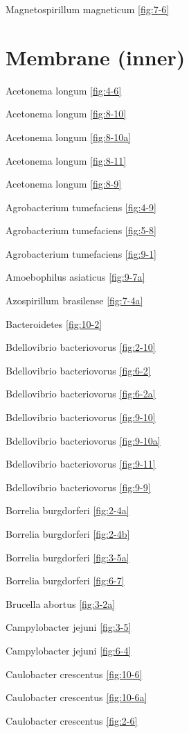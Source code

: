 \documentclass[]{tufte-book}
\begin{document}
Magnetospirillum magneticum \ref{fig:7-6}

\hypertarget{membrane-inner}{%
\section*{Membrane (inner)}\label{membrane-inner}}

Acetonema longum \ref{fig:4-6}

Acetonema longum \ref{fig:8-10}

Acetonema longum \ref{fig:8-10a}

Acetonema longum \ref{fig:8-11}

Acetonema longum \ref{fig:8-9}

Agrobacterium tumefaciens \ref{fig:4-9}

Agrobacterium tumefaciens \ref{fig:5-8}

Agrobacterium tumefaciens \ref{fig:9-1}

Amoebophilus asiaticus \ref{fig:9-7a}

Azospirillum brasilense \ref{fig:7-4a}

Bacteroidetes \ref{fig:10-2}

Bdellovibrio bacteriovorus \ref{fig:2-10}

Bdellovibrio bacteriovorus \ref{fig:6-2}

Bdellovibrio bacteriovorus \ref{fig:6-2a}

Bdellovibrio bacteriovorus \ref{fig:9-10}

Bdellovibrio bacteriovorus \ref{fig:9-10a}

Bdellovibrio bacteriovorus \ref{fig:9-11}

Bdellovibrio bacteriovorus \ref{fig:9-9}

Borrelia burgdorferi \ref{fig:2-4a}

Borrelia burgdorferi \ref{fig:2-4b}

Borrelia burgdorferi \ref{fig:3-5a}

Borrelia burgdorferi \ref{fig:6-7}

Brucella abortus \ref{fig:3-2a}

Campylobacter jejuni \ref{fig:3-5}

Campylobacter jejuni \ref{fig:6-4}

Caulobacter crescentus \ref{fig:10-6}

Caulobacter crescentus \ref{fig:10-6a}

Caulobacter crescentus \ref{fig:2-6}
\end{document}
